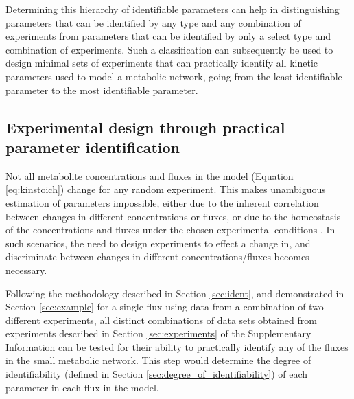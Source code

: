 \documentclass[10pt]{article}
\begin{document}
	Determining this hierarchy of identifiable parameters can help in distinguishing parameters that can be identified by any type and any combination of experiments from parameters that can be identified by only a select type and combination of experiments. Such a classification can subsequently be used to design minimal sets of experiments that can practically identify all kinetic parameters used to model a metabolic network, going from the least identifiable parameter to the most identifiable parameter.  	
	
	\subsection{Experimental design through practical parameter identification}\label{sec:experimental_design}		
	Not all metabolite concentrations and fluxes in the model (Equation \ref{eq:kinstoich}) change for any random experiment. This makes unambiguous estimation of parameters impossible, either due to the inherent correlation between changes in different concentrations or fluxes, or due to the homeostasis of the concentrations and fluxes under the chosen experimental conditions \parencite{Heijnen2013}. In such scenarios, the need to design experiments to effect a change in, and discriminate between changes in different concentrations/fluxes becomes necessary. 
	
	Following the methodology described in Section \ref{sec:ident}, and demonstrated in Section \ref{sec:example} for a single flux using data from a combination of two different experiments, all distinct combinations of data sets obtained from experiments described in Section \ref{sec:experiments} of the Supplementary Information can be tested for their ability to practically identify any of the fluxes in the small metabolic network. This step would determine the degree of identifiability (defined in Section \ref{sec:degree_of_identifiability}) of each parameter in each flux in the model. 
	
\end{document}
